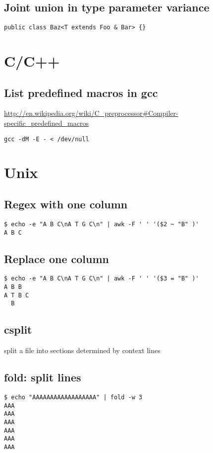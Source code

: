 \documentclass[12pt]{article}
\begin{document}
\subsection{Joint union in type parameter variance}
\begin{lstlisting}
public class Baz<T extends Foo & Bar> {}
\end{lstlisting}
\section{C/C++}
\subsection{List predefined macros in gcc}
\url{http://en.wikipedia.org/wiki/C_preprocessor#Compiler-specific_predefined_macros}
\begin{lstlisting}
gcc -dM -E - < /dev/null
\end{lstlisting}

\section{Unix}
\subsection{Regex with one column}
\begin{lstlisting}
$ echo -e "A B C\nA T G C\n" | awk -F ' ' '($2 ~ "B" )'
A B C
\end{lstlisting}
\subsection{Replace one column}
\begin{lstlisting}
$ echo -e "A B C\nA T G C\n" | awk -F ' ' '($3 = "B" )'
A B B
A T B C
  B

\end{lstlisting}
\subsection{csplit }
split a file into sections determined by context lines
\subsection{fold: split lines}
\begin{lstlisting}
$ echo "AAAAAAAAAAAAAAAAAA" | fold -w 3
AAA
AAA
AAA
AAA
AAA
AAA
\end{lstlisting}
\end{document}
